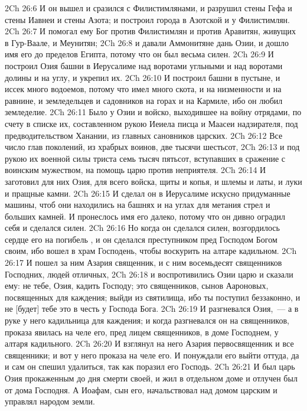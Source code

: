 \vs 2Ch 26:6 И он вышел и сразился с Филистимлянами, и разрушил стены Гефа и стены Иавнеи и стены Азота; и построил города в  Азотской и у Филистимлян.
\vs 2Ch 26:7 И помогал ему Бог против Филистимлян и против Аравитян, живущих в Гур-Ваале, и  Меунитян;
\vs 2Ch 26:8 и давали Аммонитяне дань Озии, и дошло имя его до пределов Египта, потому что он был весьма силен.
\vs 2Ch 26:9 И построил Озия башни в Иерусалиме над воротами угльными и над воротами долины и на углу, и укрепил их.
\vs 2Ch 26:10 И построил башни в пустыне, и иссек много водоемов, потому что имел много скота, и на низменности и на равнине, и земледельцев и садовников на горах и на Кармиле, ибо он любил земледелие.
\vs 2Ch 26:11 Было у Озии и войско, выходившее на войну отрядами, по счету в списке их, составленном рукою Иеиела писца и Маасеи надзирателя, под предводительством Ханании,  из главных сановников царских.
\vs 2Ch 26:12 Все число глав поколений, из храбрых воинов,  две тысячи шестьсот,
\vs 2Ch 26:13 и под рукою их военной силы триста семь тысяч пятьсот, вступавших в сражение с воинским мужеством, на помощь царю против неприятеля.
\vs 2Ch 26:14 И заготовил для них Озия, для всего войска, щиты и копья, и шлемы и латы, и луки и пращные камни.
\vs 2Ch 26:15 И сделал он в Иерусалиме искусно придуманные машины, чтоб они находились на башнях и на углах для метания стрел и больших камней. И пронеслось имя его далеко, потому что он дивно оградил себя и сделался силен.
\rsbpar\vs 2Ch 26:16 Но когда он сделался силен, возгордилось сердце его на погибель , и он сделался преступником пред Господом Богом своим, ибо вошел в храм Господень, чтобы воскурить  на алтаре кадильном.
\vs 2Ch 26:17 И пошел за ним Азария священник, и с ним восемьдесят священников Господних, людей отличных,
\vs 2Ch 26:18 и воспротивились Озии царю и сказали ему: не тебе, Озия, кадить Господу; это  священников, сынов Аароновых, посвященных для каждения; выйди из святилища, ибо ты поступил беззаконно, и не [будет] тебе это в честь у Господа Бога.
\vs 2Ch 26:19 И разгневался Озия,~--- а в руке у него кадильница для каждения; и когда разгневался он на священников, проказа явилась на челе его, пред лицем священников, в доме Господнем, у алтаря кадильного.
\vs 2Ch 26:20 И взглянул на него Азария первосвященник и все священники; и вот у него проказа на челе его. И понуждали его выйти оттуда, да и сам он спешил удалиться, так как поразил его Господь.
\vs 2Ch 26:21 И был царь Озия прокаженным до дня смерти своей, и жил в отдельном доме и отлучен был от дома Господня. А Иоафам, сын его, начальствовал над домом царским и управлял народом земли.

